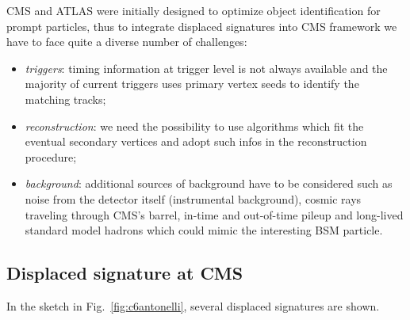 CMS and ATLAS were 
initially designed to optimize object
identification for prompt particles, thus to integrate displaced
signatures into CMS framework we have to face quite a diverse number
of challenges:
\begin{itemize}
\setlength\itemsep{-0.1em}
\item \emph{triggers}: timing information at trigger level is not always
  available and the majority of current triggers uses primary vertex
  seeds to identify the matching tracks;
\item \emph{reconstruction}: we need the possibility to use algorithms which
  fit the eventual secondary vertices and adopt such infos in the
  reconstruction procedure;
\item \emph{background}: additional sources of background have to be
  considered such as noise from the detector itself (instrumental
  background), cosmic rays traveling through CMS's barrel, in-time
  and out-of-time pileup and long-lived standard model hadrons which
  could mimic the interesting BSM particle.
\end{itemize}

\subsection{Displaced signature at CMS}
In the sketch in Fig.~\ref{fig:c6antonelli}, several displaced
signatures are shown.

